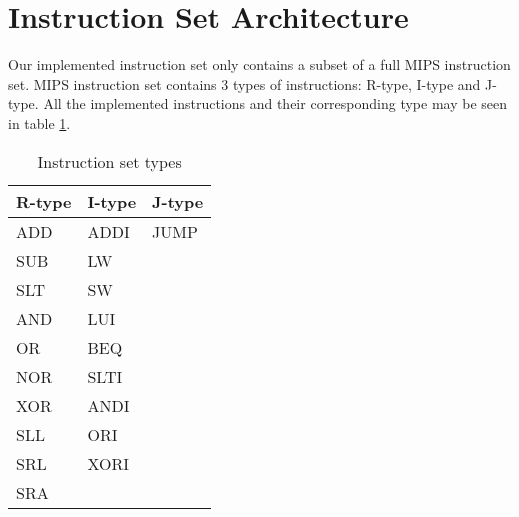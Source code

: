 \section{Instruction Set Architecture}

Our implemented instruction set only contains a subset of a full MIPS instruction set.
MIPS instruction set contains 3 types of instructions: R-type, I-type and J-type.
All the implemented instructions and their corresponding type may be seen in table \ref{table:instruction-types}.

\begin{table}
\centering
\begin{tabular}{ |l|l|l| }
  \hline
  R-type  & I-type  & J-type  \\ \hline
  ADD     & ADDI    & JUMP    \\
  SUB     & LW      &         \\
  SLT     & SW      &         \\
  AND     & LUI     &         \\
  OR      & BEQ     &         \\
  NOR     & SLTI    &         \\
  XOR     & ANDI    &         \\
  SLL     & ORI     &         \\
  SRL     & XORI    &         \\
  SRA     &         &         \\

  \hline
\end{tabular}
\caption{Instruction set types}
\label{table:instruction-types}
\end{table}

